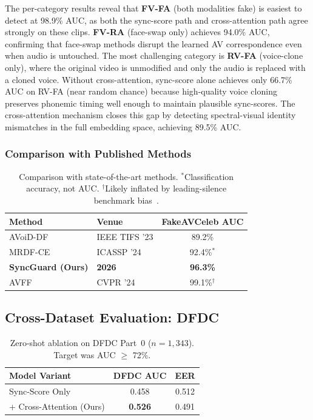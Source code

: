\documentclass[12pt, letterpaper]{article}
\begin{document}
The per-category results reveal that \textbf{FV-FA} (both modalities fake) is easiest to detect at 98.9\% AUC, as both the sync-score path and cross-attention path agree strongly on these clips. \textbf{FV-RA} (face-swap only) achieves 94.0\% AUC, confirming that face-swap methods disrupt the learned AV correspondence even when audio is untouched. The most challenging category is \textbf{RV-FA} (voice-clone only), where the original video is unmodified and only the audio is replaced with a cloned voice. Without cross-attention, sync-score alone achieves only 66.7\% AUC on RV-FA (near random chance) because high-quality voice cloning preserves phonemic timing well enough to maintain plausible sync-scores. The cross-attention mechanism closes this gap by detecting spectral-visual identity mismatches in the full embedding space, achieving 89.5\% AUC.

\subsubsection{Comparison with Published Methods}

\renewcommand{\arraystretch}{1.5}
\begin{table}[H]
\centering
\begin{tabular}{@{} l l c @{}}
\toprule
\textbf{Method} & \textbf{Venue} & \textbf{FakeAVCeleb AUC} \\
\midrule
AVoiD-DF~\cite{ilyas2023} & IEEE TIFS '23 & 89.2\% \\
MRDF-CE~\cite{hu2024} & ICASSP '24 & 92.4\%$^*$ \\
\textbf{SyncGuard (Ours)} & \textbf{2026} & \textbf{96.3\%} \\
AVFF~\cite{oorloff2024} & CVPR '24 & 99.1\%$^\dagger$ \\
\bottomrule
\end{tabular}
\caption{Comparison with state-of-the-art methods. $^*$Classification accuracy, not AUC. $^\dagger$Likely inflated by leading-silence benchmark bias~\cite{smeu2025}.}
\end{table}
\renewcommand{\arraystretch}{1.0}

\subsection{Cross-Dataset Evaluation: DFDC}

\renewcommand{\arraystretch}{1.5}
\begin{table}[H]
\centering
\begin{tabular}{@{} l c c @{}}
\toprule
\textbf{Model Variant} & \textbf{DFDC AUC} & \textbf{EER} \\
\midrule
Sync-Score Only & 0.458 & 0.512 \\
+ Cross-Attention (Ours) & \textbf{0.526} & 0.491 \\
\bottomrule
\end{tabular}
\caption{Zero-shot ablation on DFDC Part~0 ($n = 1{,}343$). Target was AUC $\geq$ 72\%.}
\end{table}
\renewcommand{\arraystretch}{1.0}
\end{document}
